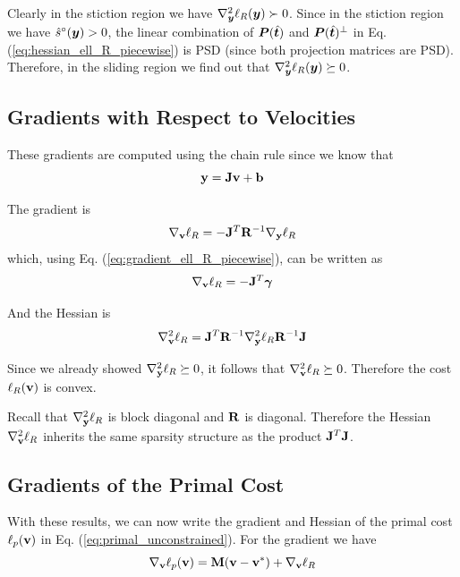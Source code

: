 Clearly in the stiction region we have $\nabla_{\bm{y}}^2\ell_R({\bm{y}})\succ 0$.
Since in the stiction region we have $\hat{s}^\circ({\bm{y}})>0$, the linear
combination of ${\bm{P}}(\hat{{\bm{t}}})$ and ${\bm{P}}(\hat{{\bm{t}}})^\perp$ in Eq.
(\ref{eq:hessian_ell_R_piecewise}) is PSD (since both projection matrices are
PSD). Therefore, in the sliding region we find out that
$\nabla_{\bm{y}}^2\ell_R({\bm{y}})\succeq 0$.

\subsection{Gradients with Respect to Velocities}
These gradients are computed using the chain rule since we know that
\begin{equation}
	{\mathbf{y}}={\mathbf{Jv+b}}
\end{equation}

The gradient is
\begin{equation}
	\nabla_\mf{v}\ell_R = -\mf{J}^T\mf{R}^{-1}\nabla_\mf{y}\ell_R
	\label{eq:ell_velocity_gradient}
\end{equation}
which, using Eq. (\ref{eq:gradient_ell_R_piecewise}), can be written as
\begin{equation}
	\nabla_\mf{v}\ell_R = -\mf{J}^T\bgamma
	\label{eq:ell_velocity_gradient_simplified}
\end{equation}

And the Hessian is
\begin{equation}
	\nabla_\mf{v}^2\ell_R = \mf{J}^T\mf{R}^{-1}\nabla_\mf{y}^2\ell_R\mf{R}^{-1}\mf{J}
	\label{eq:ell_velocity_hessian}
\end{equation}

Since we already showed $\nabla_{\mathbf{y}}^2\ell_R\succeq 0$, it follows that
$\nabla_{\mathbf{v}}^2\ell_R\succeq 0$. Therefore the cost $\ell_R({\mathbf{v}})$ is convex.

Recall that $\nabla_{\mathbf{y}}^2\ell_R$ is block diagonal and ${\mathbf{R}}$ is diagonal.
Therefore the Hessian $\nabla_{\mathbf{v}}^2\ell_R$ inherits the same sparsity
structure as the product ${\mathbf{J}}^T{\mathbf{J}}$.

\subsection{Gradients of the Primal Cost}
With these results, we can now write the gradient and Hessian of the primal cost
$\ell_p({\mathbf{v}})$ in Eq. (\ref{eq:primal_unconstrained}). For the gradient we
have
\begin{equation}
	\nabla_{\mathbf{v}}\ell_p({\mathbf{v}}) = {\mathbf{M}}({\mathbf{v}}-{\mathbf{v}}^*) + \nabla_{\mathbf{v}}\ell_R
\end{equation}

